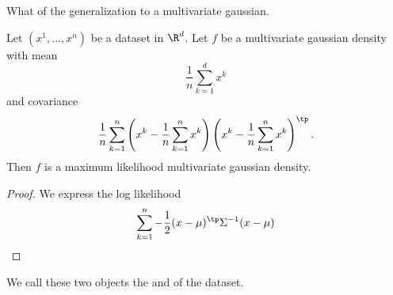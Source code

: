 

What of the generalization to a multivariate gaussian.


\begin{prop}
Let $(x^1, \dots, x^n)$ be a dataset in $\R^d$.
Let $f$ be a multivariate gaussian density with
mean
\[
  \frac{1}{n} \sum_{k = 1}^{d} x^k
\]
and covariance
\[
  \frac{1}{n}
  \sum_{k = 1}^{n}
  \left(x^k - \frac{1}{n} \sum_{k = 1}^{n} x^k\right)
  \left(x^k - \frac{1}{n} \sum_{k = 1}^{n} x^k\right)^\tp
  .
\]
Then $f$ is a maximum likelihood multivariate gaussian
density.
\begin{proof}
  We express the log likelihood
  \[
    \sum_{k = 1}^{n} -\frac{1}{2}(x - \mu)^\tp \Sigma^{-1} (x-\mu)
  \]
\end{proof}
\end{prop}
We call these two objects
the 
and 
of the dataset.
